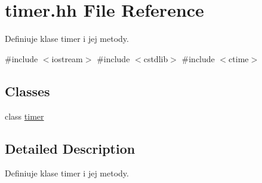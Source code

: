\hypertarget{timer_8hh}{\section{timer.\-hh \-File \-Reference}
\label{timer_8hh}
}


\-Definiuje klase timer i jej metody.  


{\ttfamily \#include $<$iostream$>$}\*
{\ttfamily \#include $<$cstdlib$>$}\*
{\ttfamily \#include $<$ctime$>$}\*
\subsection*{\-Classes}
\begin{DoxyCompactItemize}
\item 
class \hyperlink{classtimer}{timer}
\end{DoxyCompactItemize}


\subsection{\-Detailed \-Description}
\-Definiuje klase timer i jej metody. 